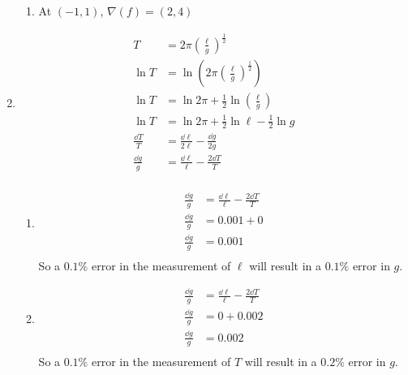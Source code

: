 \documentclass[10pt,\jkfside,a4paper]{article}
\begin{document}
\begin{enumerate}
\begin{enumerate}
\item At $(-1, 1)$, $\nabla (f) = (2, 4)$

\begin{center}
\end{center}

\end{enumerate}

\item 
\begin{equation}
\begin{split}
T &= 2\pi\left(\frac{\ell}{g}\right)^{\frac{1}{2}}\\
\ln T &= \ln \left(2\pi\left(\frac{\ell}{g}\right)^{\frac{1}{2}}\right)\\
\ln T &= \ln 2\pi + \frac{1}{2} \ln \left(\frac{\ell}{g}\right)\\
\ln T &= \ln 2\pi + \frac{1}{2} \ln \ell - \frac{1}{2}\ln g\\
\frac{\dd T}{T} &= \frac{\dd \ell}{2\ell} - \frac{\dd g}{2g}\\
\frac{\dd g}{g} &= \frac{\dd \ell}{\ell} - \frac{2\dd T}{T}\\
\end{split}
\end{equation}

\begin{enumerate}

\item
\begin{equation}
\begin{split}
\frac{\dd g}{g} &= \frac{\dd \ell}{\ell} - \frac{2\dd T}{T}\\
\frac{\dd g}{g} &= 0.001 + 0\\
\frac{\dd g}{g} &= 0.001\\
\end{split}
\end{equation}
So a $0.1\%$ error in the measurement of $\ell$ will result in a $0.1\%$ error in $g$.

\item 
\begin{equation}
\begin{split}
\frac{\dd g}{g} &= \frac{\dd \ell}{\ell} - \frac{2\dd T}{T}\\
\frac{\dd g}{g} &= 0 + 0.002\\
\frac{\dd g}{g} &= 0.002\\
\end{split}
\end{equation}
So a $0.1\%$ error in the measurement of $T$ will result in a $0.2\%$ error in $g$.


\end{enumerate}
\end{enumerate}
\end{document}
